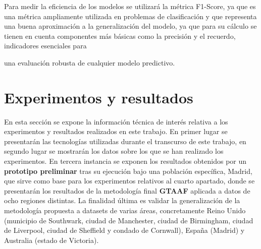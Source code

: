 \documentclass{uathesis-es}
\begin{document}
Para medir la eficiencia de los modelos se utilizará la métrica F1-Score, ya que es una métrica ampliamente utilizada en problemas de clasificación y que representa una buena aproximación a la generalización del modelo, ya que para su cálculo se tienen en cuenta componentes más básicas como la precisión y el recuerdo, indicadores esenciales para {una evaluación robusta de cualquier modelo predictivo.


\chapter{Experimentos y resultados}

En esta sección se expone la información técnica de interés relativa a los experimentos y resultados realizados en este trabajo. En primer lugar se presentarán las tecnologías utilizadas durante el transcurso de este trabajo, en segundo lugar se mostrarán los datos sobre los que se han realizado los experimentos. En tercera instancia se exponen los resultados obtenidos por un \textbf{prototipo preliminar} tras su ejecución bajo una población específica, Madrid, que sirve como base para los experimentos relativos al cuarto apartado, donde se presentarán los resultados de la metodología final \textbf{GTAAF} aplicada a datos de ocho regiones distintas. La finalidad última es validar la generalización de la metodología propuesta a datasets de varias áreas, concretamente Reino Unido (municipio de Southwark, ciudad de Manchester, ciudad de Birmingham, ciudad de Liverpool, ciudad de Sheffield y condado de Cornwall), España (Madrid) y Australia (estado de Victoria).






}
\end{document}
